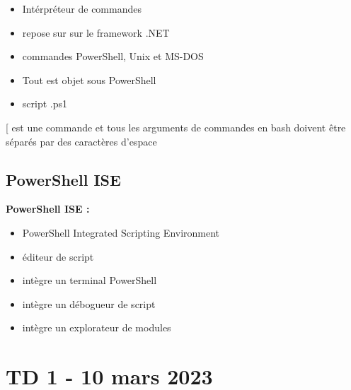 \documentclass[12pt, a4paper]{article}
\begin{document}
    \begin{itemize}
        \item Intérpréteur de commandes
        \item repose sur sur le framework .NET
        \item commandes PowerShell, Unix et MS-DOS
        \item Tout est objet sous PowerShell
        \item script .ps1\\
    \end{itemize}

[ est une commande et tous les arguments de commandes en bash doivent être séparés par des caractères d'espace


\subsection{PowerShell ISE}
\textbf{PowerShell ISE :}\\

    \begin{itemize}
        \item PowerShell Integrated Scripting Environment
        \item éditeur de script
        \item intègre un terminal PowerShell
        \item intègre un débogueur de script
        \item intègre un explorateur de modules\\
    \end{itemize}

   
\newpage
\section{TD 1 - 10 mars 2023}
\end{document}
